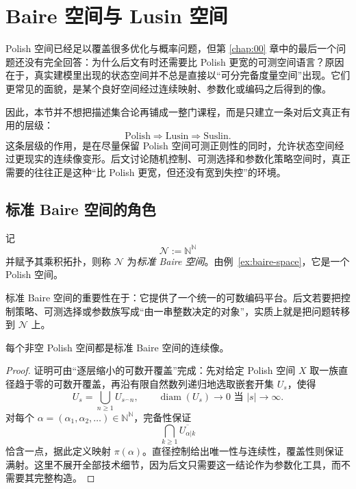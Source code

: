 \section{Baire 空间与 Lusin 空间}

\label{sec:1-4}

Polish 空间已经足以覆盖很多优化与概率问题，但第 \ref{chap:00} 章中的最后一个问题还没有完全回答：为什么后文有时还需要比 Polish 更宽的可测空间语言？原因在于，真实建模里出现的状态空间并不总是直接以“可分完备度量空间”出现。它们更常见的面貌，是某个良好空间经过连续映射、参数化或编码之后得到的像。

因此，本节并不想把描述集合论再铺成一整门课程，而是只建立一条对后文真正有用的层级：
\[
\text{Polish} \Longrightarrow \text{Lusin} \Longrightarrow \text{Suslin}.
\]
这条层级的作用，是在尽量保留 Polish 空间可测正则性的同时，允许状态空间经过更现实的连续像变形。后文讨论随机控制、可测选择和参数化策略空间时，真正需要的往往正是这种“比 Polish 更宽，但还没有宽到失控”的环境。

\subsection{标准 Baire 空间的角色}

\begin{definition}[标准 Baire 空间]\label{def:standard-baire-space}
记
\[
\mathcal N:=\mathbb N^{\mathbb N}
\]
并赋予其乘积拓扑，则称 $\mathcal N$ 为\emph{标准 Baire 空间}。由例~\ref{ex:baire-space}，它是一个 Polish 空间。
\end{definition}

标准 Baire 空间的重要性在于：它提供了一个统一的可数编码平台。后文若要把控制策略、可测选择或参数族写成“由一串整数决定的对象”，实质上就是把问题转移到 $\mathcal N$ 上。

\begin{proposition}\label{prop:baire-space-surjection}
每个非空 Polish 空间都是标准 Baire 空间的连续像。
\end{proposition}

\begin{proof}
证明可由“逐层缩小的可数开覆盖”完成：先对给定 Polish 空间 $X$ 取一族直径趋于零的可数开覆盖，再沿有限自然数列递归地选取嵌套开集 $U_s$，使得
\[
U_s=\bigcup_{n\ge1}U_{s^\frown n},\qquad \operatorname{diam}(U_s)\to 0 \text{ 当 }|s|\to\infty.
\]
对每个 $\alpha=(\alpha_1,\alpha_2,\dots)\in\mathbb N^{\mathbb N}$，完备性保证
\[
\bigcap_{k\ge1}\overline{U_{\alpha|k}}
\]
恰含一点，据此定义映射 $\pi(\alpha)$。直径控制给出唯一性与连续性，覆盖性则保证满射。这里不展开全部技术细节，因为后文只需要这一结论作为参数化工具，而不需要其完整构造。
\end{proof}

